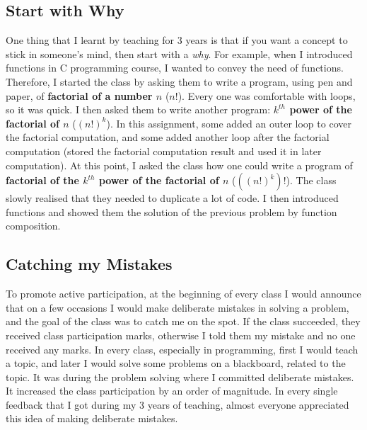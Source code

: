 \documentclass[11pt,a4paper,roman]{moderncv}
\begin{document}
\subsection{Start with Why}
One thing that I learnt by teaching for 3 years is that if you want a concept 
to stick in someone's mind, then start with a \textit{why}. For example, when I introduced functions 
in C programming course, I wanted to convey the need of functions. Therefore, I started the class by 
asking them to write a program, using pen and paper, of \textbf{factorial of a number $n$} ($n!$). 
Every one was comfortable with loops, so it was quick. I then asked them to write 
another program: \textbf{$k^{th}$ power of the factorial of $n$} ($(n!)^k$). 
In this assignment, some added an outer loop to cover the factorial computation, 
and some added another loop after the factorial computation (stored the factorial 
computation result and used it in later computation). 
At this point, I asked the class 
how one could write a program of \textbf{factorial of 
the $k^{th}$ power of the factorial of $n$} ($((n!)^k)!$). The class slowly realised 
that they needed to duplicate a lot of code. I then introduced functions 
and showed them the solution of the previous problem by function composition.


\subsection{Catching my Mistakes}
To promote active participation, at the beginning of every class I would announce that 
on a few occasions I would make deliberate mistakes in solving a problem, and the
goal of the class was to catch me on the spot.
If the class succeeded, they received  
class participation marks, otherwise I told them my 
mistake and no one received any marks.
In every class, especially in programming, 
first I would teach a topic, and later I would solve some problems on 
a blackboard, related to the topic. 
It was during the problem solving where I committed deliberate mistakes.
It increased the class participation by an order of 
magnitude. In every single 
feedback that I got during my 3 years of teaching, 
almost everyone appreciated this idea of making deliberate mistakes. 
\end{document}
